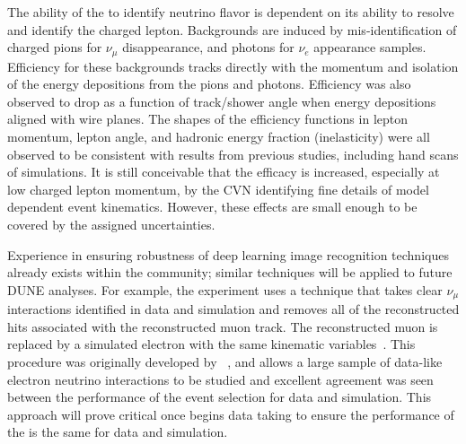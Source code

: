 The ability of the  to identify neutrino flavor is dependent on its ability to resolve and identify the charged lepton. %
Backgrounds are induced by mis-identification of charged pions for $\nu_{\mu}$ disappearance, and photons for $\nu_{e}$ appearance samples. Efficiency for these backgrounds tracks directly with the momentum and isolation of the energy depositions from the pions and photons. Efficiency was also observed to drop as a function of track/shower angle when energy depositions aligned with wire planes. The shapes of the efficiency functions in lepton momentum, lepton angle, and hadronic energy fraction (inelasticity) were all observed to be consistent with results from previous studies, including hand scans of  simulations. It is still conceivable that the efficacy is increased, especially at low charged lepton momentum, by the CVN identifying fine details of model dependent event kinematics. However, these effects are small enough to be covered by the assigned uncertainties. 





Experience in ensuring robustness of deep learning image recognition techniques already exists within the community; similar techniques will be applied to future DUNE analyses. For example, the  experiment uses a technique that takes clear $\nu_{\mu}$  interactions identified in data and simulation and removes all of the reconstructed hits associated with the reconstructed muon track. The reconstructed muon is replaced by a simulated electron with the same kinematic variables~\cite{Sachdev:2015hpa,Gandrajula:2018ytr}. This procedure was originally developed by ~\cite{Boehm:2009zz}, and allows a large sample of data-like electron neutrino interactions to be studied and excellent agreement was seen between the performance of the event selection for data and simulation. This approach will prove critical once  begins data taking to ensure the performance of the  is the same for data and simulation.

